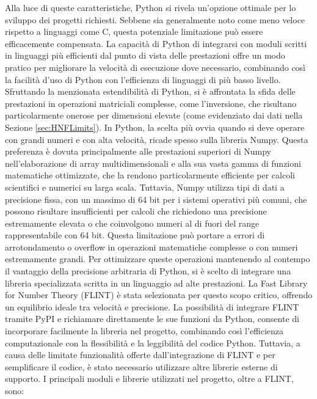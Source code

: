 Alla luce di queste caratteristiche, Python si rivela un'opzione ottimale per lo sviluppo 
dei progetti richiesti. Sebbene sia generalmente noto come meno veloce rispetto a 
linguaggi come C, questa potenziale limitazione può essere efficacemente compensata. 
La capacità di Python di integrarsi con moduli scritti in linguaggi più efficienti dal 
punto di vista delle prestazioni offre un modo pratico per migliorare la velocità di 
esecuzione dove necessario, combinando così la facilità d'uso di Python con l'efficienza 
di linguaggi di più basso livello.
Sfruttando la menzionata estendibilità di Python, si è affrontata la sfida delle prestazioni 
in operazioni matriciali complesse, come l'inversione, che risultano particolarmente onerose 
per dimensioni elevate (come evidenziato dai dati nella Sezione \ref{sec:HNFLimits}). 
In Python, la scelta più ovvia quando si deve operare con grandi numeri e con alta velocità,
ricade spesso sulla libreria Numpy. 
Questa preferenza è dovuta principalmente alle prestazioni superiori di Numpy nell'elaborazione 
di array multidimensionali e alla sua vasta gamma di funzioni matematiche ottimizzate, 
che la rendono particolarmente efficiente per calcoli scientifici e numerici su larga scala. 
Tuttavia, Numpy utilizza tipi di dati a precisione fissa, con un massimo di 64 bit per i 
sistemi operativi più comuni, che 
possono risultare insufficienti per calcoli che richiedono una precisione estremamente 
elevata o che coinvolgono numeri al di fuori del range rappresentabile con 64 bit. 
Questa limitazione può portare a errori di arrotondamento o overflow in operazioni 
matematiche complesse o con numeri estremamente grandi.
Per ottimizzare queste operazioni mantenendo al contempo il vantaggio della precisione 
arbitraria di Python, si è scelto di integrare una libreria specializzata scritta in un 
linguaggio ad alte prestazioni. La Fast Library for Number Theory \cite{FLINT} (FLINT) è stata 
selezionata per questo scopo critico, offrendo un equilibrio ideale tra velocità e 
precisione.
La possibilità di integrare FLINT tramite PyPI e richiamare direttamente le sue funzioni 
da Python, consente di incorporare facilmente la libreria nel progetto, combinando così 
l'efficienza computazionale con la flessibilità e la leggibilità del codice Python. 
Tuttavia, a causa delle limitate funzionalità offerte dall'integrazione di FLINT e per 
semplificare il codice, è stato necessario utilizzare altre librerie esterne di supporto.
I principali moduli e librerie utilizzati nel progetto, oltre a FLINT, sono:

